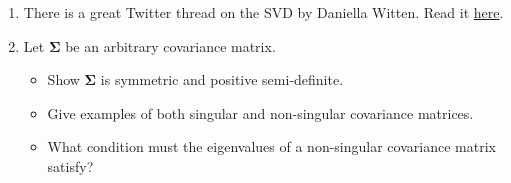 \documentclass[
]{book}
\providecommand{\tightlist}{%
  \setlength{\itemsep}{0pt}\setlength{\parskip}{0pt}}
\theoremstyle{definition}
\theoremstyle{definition}
\theoremstyle{definition}
\theoremstyle{definition}
\theoremstyle{remark}
\begin{document}
\begin{enumerate}
\def\labelenumi{\arabic{enumi}.}
\setcounter{enumi}{-1}
\item
  There is a great Twitter thread on the SVD by Daniella Witten. Read it \href{https://twitter.com/WomenInStat/status/1285610321747611653}{here}.
\item
  Let \(\boldsymbol{\Sigma}\) be an arbitrary covariance matrix.

  \begin{itemize}
  \tightlist
  \item
    Show \(\boldsymbol{\Sigma}\) is symmetric and
    positive semi-definite.
  \item
    Give examples of both singular and non-singular covariance matrices.\\
  \item
    What condition must the eigenvalues of a non-singular covariance matrix satisfy?
  \end{itemize}
\end{enumerate}
\end{document}
